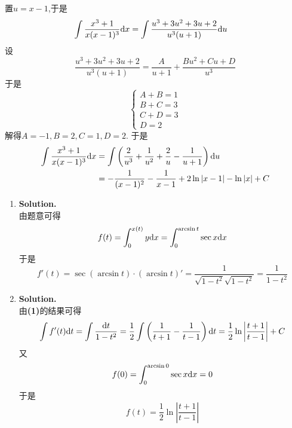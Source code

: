 \documentclass{ctexart}
\begin{document}
\begin{solution}[Solution.]
    置$u=x-1$,于是
    $$\begin{aligned}
        \int\dfrac{x^3+1}{x(x-1)^3}\mathrm{d} x
        &= \int\dfrac{u^3+3u^2+3u+2}{u^3(u+1)}\mathrm{d} u
    \end{aligned}$$
    设$$\dfrac{u^3+3u^2+3u+2}{u^3(u+1)}=\dfrac{A}{u+1}+\dfrac{Bu^2+Cu+D}{u^3}$$
    于是$$\left\{\begin{array}{l}
        A+B=1\\
        B+C=3\\
        C+D=3\\
        D=2
    \end{array}\right.$$
    解得$A=-1,B=2,C=1,D=2$.
    于是$$\begin{aligned}
        \int\dfrac{x^3+1}{x(x-1)^3}\mathrm{d} x
        &= \int\left(\dfrac{2}{u^3}+\dfrac{1}{u^2}+\dfrac{2}{u}-\dfrac{1}{u+1}\right)\mathrm{d} u\\
        &= -\dfrac{1}{(x-1)^2}-\dfrac{1}{x-1}+2\ln\left|x-1\right|-\ln\left|x\right|+C
    \end{aligned}$$
\end{solution}
\begin{solution}[Solution.]
    
\end{solution}
\begin{solution}
    \begin{enumerate}[label=\textbf{(\arabic*)}]
        \item \textbf{Solution.}\\
            由题意可得$$f(t)=\int_{0}^{x(t)}y\mathrm{d} x=\int_0^{\arcsin{t}}\sec x\mathrm{d} x$$
            于是$$f'(t)=\sec(\arcsin t)\cdot\left(\arcsin t\right)'=\dfrac{1}{\sqrt{1-t^2}\sqrt{1-t^2}}=\dfrac{1}{1-t^2}$$
        \item \textbf{Solution.}\\
            由\textbf{(1)}的结果可得
            $$\int f'(t)\mathrm{d} t=\int\dfrac{\mathrm{d} t}{1-t^2}=\dfrac{1}{2}\int\left(\dfrac{1}{t+1}-\dfrac{1}{t-1}\right)\mathrm{d} t=\dfrac{1}{2}\ln\left|\dfrac{t+1}{t-1}\right|+C$$
            又$$f(0)=\int_0^{\arcsin0}\sec x\mathrm{d} x=0$$
            于是$$f(t)=\dfrac{1}{2}\ln\left|\dfrac{t+1}{t-1}\right|$$
    \end{enumerate}
\end{solution}
\end{document}
